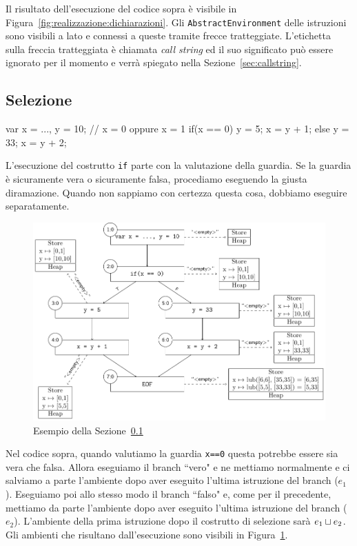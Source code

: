 Il risultato dell'esecuzione del codice sopra è visibile in Figura~\ref{fig:realizzazione:dichiarazioni}. Gli \texttt{AbstractEnvironment} delle istruzioni sono visibili a lato e connessi a queste tramite frecce tratteggiate. L'etichetta sulla freccia tratteggiata è chiamata \emph{call string} ed il suo significato può essere ignorato per il momento e verrà spiegato nella Sezione~\ref{sec:callstring}.

\subsection{Selezione}\label{sec:realizzazione:selezione}
\begin{javascriptcode}
var x = ..., y = 10; // x = 0 oppure x = 1
if(x == 0) {
    y = 5;
    x = y + 1;
} else {
    y = 33;
    x = y + 2;
}
\end{javascriptcode}
L'esecuzione del costrutto \texttt{if} parte con la valutazione della guardia. Se la guardia è sicuramente vera o sicuramente falsa, procediamo eseguendo la giusta diramazione. Quando non sappiamo con certezza questa cosa, dobbiamo eseguire separatamente.

\begin{figure}[htbp]
    \centering
    \includegraphics[width=\textwidth]{scheme-generator/generated/example-if.pdf}
    \caption{Esempio della Sezione~\ref{sec:realizzazione:selezione}}
    \label{fig:realizzazione:selezione}
\end{figure}

Nel codice sopra, quando valutiamo la guardia \texttt{x==0} questa potrebbe essere sia vera che falsa. Allora eseguiamo il branch ``vero" e ne mettiamo normalmente e ci salviamo a parte l'ambiente dopo aver eseguito l'ultima istruzione del branch ($e_1$). Eseguiamo poi allo stesso modo il branch ``falso" e, come per il precedente, mettiamo da parte l'ambiente dopo aver eseguito l'ultima istruzione del branch ($e_2$). L'ambiente della prima istruzione dopo il costrutto di selezione sarà $\join[e_1][e_2]$. 
Gli ambienti che risultano dall'esecuzione sono visibili in Figura~\ref{fig:realizzazione:selezione}.

